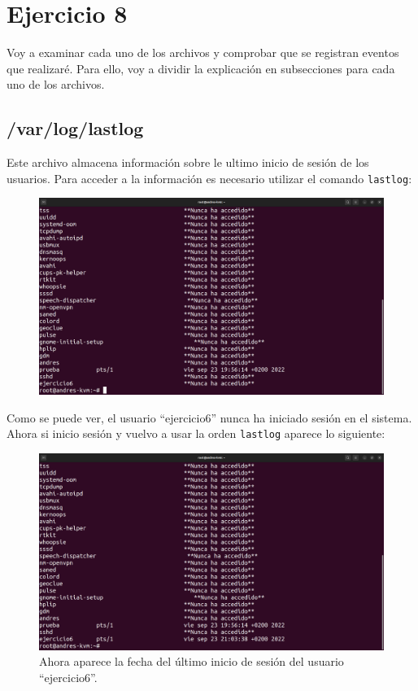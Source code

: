 \documentclass{article}
\begin{document}
\section*{Ejercicio 8}
Voy a examinar cada uno de los archivos y comprobar que se registran eventos que realizaré. Para ello, voy a dividir la explicación en subsecciones para cada uno de los archivos.

\subsection*{/var/log/lastlog}
Este archivo almacena información sobre le ultimo inicio de sesión de los usuarios. Para acceder a la información es necesario utilizar el comando \verb|lastlog|:

\begin{figure}[H]
    \includegraphics[width=\textwidth]{imagenes/lastlogejercicio6never.png}
\end{figure}

Como se puede ver, el usuario ``ejercicio6'' nunca ha iniciado sesión en el sistema. Ahora si inicio sesión y vuelvo a usar la orden \verb|lastlog| aparece lo siguiente:

\begin{figure}[H]
    \includegraphics[width=\textwidth]{imagenes/lastlogejercicio6ok.png}
    \caption{Ahora aparece la fecha del último inicio de sesión del usuario ``ejercicio6''.}
\end{figure}
\end{document}
